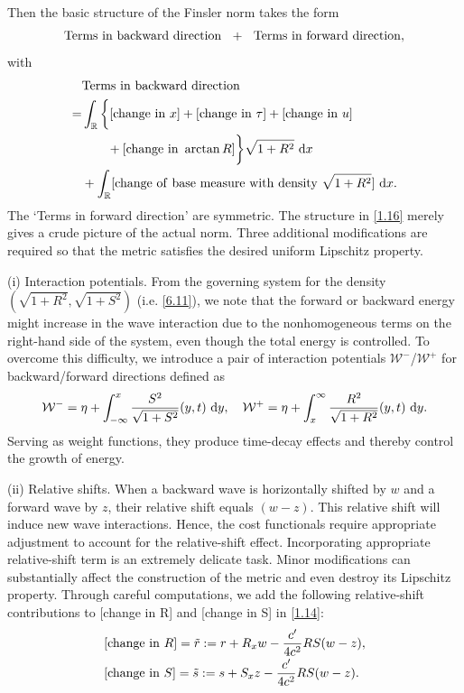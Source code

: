\documentclass[11pt,reqno]{article}
\newcommand{\dps}{\displaystyle}
\newcommand{\fr}{\frac}
\numberwithin{equation}{section}
\begin{document}
Then the basic structure of the Finsler norm takes the form
\begin{align}\label{1.15}
{\rm Terms\ in\  backward\ direction}\ \ +\ \ {\rm Terms\ in\ forward\ direction},
\end{align}
with
\begin{align}\label{1.16}
\begin{split}
&{\rm Terms\ in\  backward\ direction}  \\
=&\int_{\mathbb{R}}\bigg\{[{\rm change\ in}\ x] +[{\rm change\ in}\ \tau] +[{\rm change\ in}\ u] \\
&\qquad +[{\rm change\ in}\ \arctan R]\bigg\}\sqrt{1+R^2}\ {\rm d}x \\
&+\int_{\mathbb{R}}[{\rm change\ of\ base\ measure\ with\ density} \ \sqrt{1+R^2}]\ {\rm d}x.
\end{split}
\end{align}
The `Terms in forward direction' are symmetric. The structure in \eqref{1.16} merely gives a crude picture of the actual norm. Three additional modifications are required so that the metric satisfies the desired uniform Lipschitz property.

\noindent (i) Interaction potentials. From the governing system for the density $(\sqrt{1+R^2}, \sqrt{1+S^2})$ (i.e. \eqref{6.11}), we note that the forward or backward energy
might increase in the wave interaction due to the nonhomogeneous terms on the right-hand side of the system, even though the total energy is controlled. To overcome this difficulty, we introduce a pair of interaction potentials $\mathcal{W}^-$/$\mathcal{W}^+$ for backward/forward directions defined as
\begin{align}\label{1.17}
\begin{split}
\mathcal{W}^-=\eta+\int_{-\infty}^x\fr{S^2}{\sqrt{1+S^2}}(y,t)\ {\rm d}y,\quad \mathcal{W}^+=\eta+\int_{x}^\infty \fr{R^2}{\sqrt{1+R^2}}(y,t)\ {\rm d}y.
\end{split}
\end{align}
Serving as weight functions, they produce time-decay effects and thereby control the growth of energy.

\noindent (ii) Relative shifts. When a backward wave is horizontally shifted by $w$
and a forward wave by $z$, their relative shift equals $(w-z)$. This relative shift will induce new wave interactions. Hence, the cost functionals require appropriate adjustment to account for the relative-shift effect. Incorporating appropriate relative-shift term is an extremely delicate task. Minor modifications can substantially affect the construction of the metric and even destroy its Lipschitz property. Through careful computations, we add the following relative-shift contributions to [change in R] and [change in S] in \eqref{1.14}:
\begin{align}\label{1.18}
\begin{array}{l}
\dps [{\rm change\ in}\ R]=\tilde{r}:=r+R_x w-\fr{c'}{4c^2}RS(w-z),\\[6pt]
\dps [{\rm change\ in}\ S]=\tilde{s}:=s+S_x z-\fr{c'}{4c^2}RS(w-z).
\end{array}
\end{align}
\end{document}
